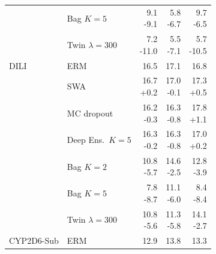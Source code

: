 {\begin{longtable}{llrrr}
     & Bag $K{=}5$ & \makecell[r]{9.1\\-9.1} & \makecell[r]{5.8\\-6.7} & \makecell[r]{9.7\\-6.5} \\
     & Twin $\lambda{=}300$ & \makecell[r]{7.2\\-11.0} & \makecell[r]{5.5\\-7.1} & \makecell[r]{5.7\\-10.5} \\
    \midrule
    DILI & ERM & \makecell[r]{16.5\\\strut} & \makecell[r]{17.1\\\strut} & \makecell[r]{16.8\\\strut} \\
     & SWA & \makecell[r]{16.7\\+0.2} & \makecell[r]{17.0\\-0.1} & \makecell[r]{17.3\\+0.5} \\
     & MC dropout & \makecell[r]{16.2\\-0.3} & \makecell[r]{16.3\\-0.8} & \makecell[r]{17.8\\+1.1} \\
     & Deep Ens.\ $K{=}5$ & \makecell[r]{16.3\\-0.2} & \makecell[r]{16.3\\-0.8} & \makecell[r]{17.0\\+0.2} \\
     & Bag $K{=}2$ & \makecell[r]{10.8\\-5.7} & \makecell[r]{14.6\\-2.5} & \makecell[r]{12.8\\-3.9} \\
     & Bag $K{=}5$ & \makecell[r]{7.8\\-8.7} & \makecell[r]{11.1\\-6.0} & \makecell[r]{8.4\\-8.4} \\
     & Twin $\lambda{=}300$ & \makecell[r]{10.8\\-5.6} & \makecell[r]{11.3\\-5.8} & \makecell[r]{14.1\\-2.7} \\
    \midrule
    CYP2D6-Sub & ERM & \makecell[r]{12.9\\\strut} & \makecell[r]{13.8\\\strut} & \makecell[r]{13.3\\\strut} \\

\end{longtable}}
